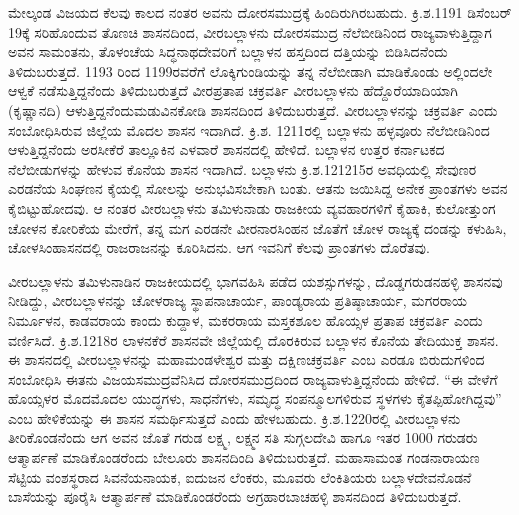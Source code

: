 ಮೇಲ್ಕಂಡ ವಿಜಯದ ಕೆಲವು ಕಾಲದ ನಂತರ ಅವನು ದೋರಸಮುದ್ರಕ್ಕೆ ಹಿಂದಿರುಗಿರಬಹುದು. ಕ್ರಿ.ಶ.1191 ಡಿಸೆಂಬರ್​ 19ಕ್ಕೆ ಸರಿಹೊಂದುವ ತೊಣಚಿ ಶಾಸನದಿಂದ, ವೀರಬಲ್ಲಾಳನು ದೋರಸಮುದ್ರ ನೆಲೆಬೀಡಿನಿಂದ ರಾಜ್ಯವಾಳುತ್ತಿದ್ದಾಗ ಅವನ ಸಾಮಂತನು, ತೊಳಂಚೆಯ ಸಿದ್ಧನಾಥದೇವರಿಗೆ ಬಲ್ಲಾಳನ ಹಸ್ತದಿಂದ ದತ್ತಿಯನ್ನು ಬಿಡಿಸಿದನೆಂದು ತಿಳಿದುಬರುತ್ತದೆ. 1193 ರಿಂದ 1199ರವರೆಗೆ ಲೊಕ್ಕಿಗುಂಡಿಯನ್ನು ತನ್ನ ನೆಲೆಬೀಡಾಗಿ ಮಾಡಿಕೊಂಡು ಅಲ್ಲಿಂದಲೇ ಆಳ್ವಕೆ ನಡೆಸುತ್ತಿದ್ದನೆಂದು ತಿಳಿದುಬರುತ್ತದೆ ವೀರಪ್ರತಾಪ ಚಕ್ರವರ್ತಿ ವೀರಬಲ್ಲಾಳನು ಹೆದ್ದೊರೆಯಾದಿಯಾಗಿ (ಕೃಷ್ಣಾನದಿ) ಆಳುತ್ತಿದ್ದನೆಂದು\break ಮಡುವಿನಕೋಡಿ ಶಾಸನದಿಂದ ತಿಳಿದುಬರುತ್ತದೆ. ವೀರಬಲ್ಲಾಳನನ್ನು ಚಕ್ರವರ್ತಿ ಎಂದು ಸಂಬೋಧಿಸಿರುವ ಜಿಲ್ಲೆಯ ಮೊದಲ ಶಾಸನ ಇದಾಗಿದೆ. ಕ್ರಿ.ಶ. 1211ರಲ್ಲಿ ಬಲ್ಲಾಳನು ಹಳ್ಳವೂರು ನೆಲೆಬೀಡಿನಿಂದ ಆಳುತ್ತಿದ್ದನೆಂದು ಅರಸೀಕೆರೆ ತಾಲ್ಲೂಕಿನ ಎಳವಾರೆ ಶಾಸನದಲ್ಲಿ ಹೇಳಿದೆ. ಬಲ್ಲಾಳನ ಉತ್ತರ ಕರ್ನಾಟಕದ ನೆಲೆಬೀಡುಗಳನ್ನು ಹೇಳುವ ಕೊನೆಯ ಶಾಸನ ಇದಾಗಿದೆ. ಬಲ್ಲಾಳನು ಕ್ರಿ.ಶ.121215ರ ಅವಧಿಯಲ್ಲಿ ಸೇವುಣರ ಎರಡನೆಯ ಸಿಂಘಣನ ಕೈಯಲ್ಲಿ ಸೋಲನ್ನು ಅನುಭವಿಸಬೇಕಾಗಿ ಬಂತು. ಆತನು ಜಯಿಸಿದ್ದ ಅನೇಕ ಪ್ರಾಂತಗಳು ಅವನ ಕೈಬಿಟ್ಟುಹೋದವು. ಆ ನಂತರ ವೀರಬಲ್ಲಾಳನು ತಮಿಳುನಾಡು ರಾಜಕೀಯ ವ್ಯವಹಾರಗಳಿಗೆ ಕೈಹಾಕಿ, ಕುಲೋತ್ತುಂಗ ಚೋಳನ ಕೋರಿಕೆಯ ಮೇರೆಗೆ, ತನ್ನ ಮಗ ಎರಡನೇ ವೀರನಾರಸಿಂಹನ ಜೊತೆಗೆ ಚೋಳ ರಾಜ್ಯಕ್ಕೆ ದಂಡನ್ನು ಕಳುಹಿಸಿ, ಚೋಳಸಿಂಹಾಸನದಲ್ಲಿ ರಾಜರಾಜನನ್ನು ಕೂರಿಸಿದನು. ಆಗ ಇವನಿಗೆ ಕೆಲವು ಪ್ರಾಂತಗಳು ದೊರೆತವು.

ವೀರಬಲ್ಲಾಳನು ತಮಿಳುನಾಡಿನ ರಾಜಕೀಯದಲ್ಲಿ ಭಾಗವಹಿಸಿ ಪಡೆದ ಯಶಸ್ಸುಗಳನ್ನು, ದೊಡ್ಡಗರುಡನಹಳ್ಳಿ ಶಾಸನವು ನೀಡಿದ್ದು, ವೀರಬಲ್ಲಾಳನನ್ನು ಚೋಳರಾಜ್ಯ ಸ್ಥಾಪನಾಚಾರ್ಯ, ಪಾಂಡ್ಯರಾಯ ಪ್ರತಿಷ್ಠಾಚಾರ್ಯ, ಮಗರರಾಯ ನಿರ್ಮೂಳನ, ಕಾಡವರಾಯ ಕಾಂದು ಕುದ್ದಾಳ, ಮಕರರಾಯ ಮಸ್ತಕಶೂಲ ಹೊಯ್ಸಳ ಪ್ರತಾಪ ಚಕ್ರವರ್ತಿ ಎಂದು ವರ್ಣಿಸಿದೆ. ಕ್ರಿ.ಶ.1218ರ ಲಾಳನಕೆರೆ ಶಾಸನವೇ ಜಿಲ್ಲೆಯಲ್ಲಿ ದೊರಕಿರುವ ಬಲ್ಲಾಳನ ಕೊನೆಯ ತೇದಿಯುಕ್ತ ಶಾಸನ. ಈ ಶಾಸನದಲ್ಲಿ ವೀರಬಲ್ಲಾಳನನ್ನು ಮಹಾಮಂಡಳೇಶ್ವರ ಮತ್ತು ದಕ್ಷಿಣಚಕ್ರವರ್ತಿ ಎಂಬ ಎರಡೂ ಬಿರುದುಗಳಿಂದ ಸಂಬೋಧಿಸಿ ಈತನು ವಿಜಯಸಮುದ್ರವೆನಿಸಿದ ದೋರಸಮುದ್ರದಿಂದ ರಾಜ್ಯವಾಳುತ್ತಿದ್ದನೆಂದು ಹೇಳಿದೆ. “ಈ ವೇಳೆಗೆ ಹೊಯ್ಸಳರ ಮೊದಮೊದಲ ಯುದ್ಧಗಳು, ಸಾಧನೆಗಳು, ಸಮೃದ್ಧ ಸಂಪನ್ಮೂಲಗಳಿರುವ ಸ್ಥಳಗಳು ಕೈತಪ್ಪಿಹೋಗಿದ್ದವು” ಎಂಬ ಹೇಳಿಕೆಯನ್ನು ಈ ಶಾಸನ ಸಮರ್ಥಿಸುತ್ತದೆ ಎಂದು ಹೇಳಬಹುದು. ಕ್ರಿ.ಶ.1220ರಲ್ಲಿ ವೀರಬಲ್ಲಾಳನು ತೀರಿಕೊಂಡನೆಂದು ಆಗ ಅವನ ಜೊತೆ ಗರುಡ ಲಕ್ಷ್ಮ, ಲಕ್ಷ್ಮನ ಸತಿ ಸುಗ್ಗಲದೇವಿ ಹಾಗೂ ಇತರ 1000 ಗರುಡರು ಆತ್ಮಾರ್ಪಣೆ ಮಾಡಿಕೊಂಡರೆಂದು ಬೇಲೂರು ಶಾಸನದಿಂದಿ ತಿಳಿದುಬರುತ್ತದೆ. ಮಹಾಸಾಮಂತ ಗಂಡನಾರಾಯಣ ಸೆಟ್ಟಿಯ ವಂಶಸ್ಥರಾದ ಸಿವನೆಯನಾಯಕ, ಐದುಜನ ಲೆಂಕರು, ಮೂವರು ಲೆಂಕಿತಿಯರು ಬಲ್ಲಾಳದೇವನೊಡನೆ ಬಾಸೆಯನ್ನು ಪೂರೈಸಿ ಆತ್ಮಾರ್ಪಣೆ ಮಾಡಿಕೊಂಡರೆಂದು ಅಗ್ರಹಾರಬಾಚಹಳ್ಳಿ ಶಾಸನದಿಂದ ತಿಳಿದುಬರುತ್ತದೆ.

